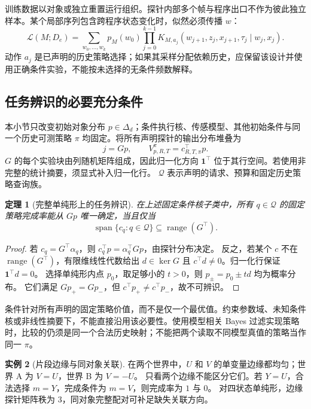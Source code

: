 \documentclass[11pt,a4paper,fontset=fandol]{ctexart}
\newtheorem{theorem}{定理}[section]
\theoremstyle{definition}
\newtheorem{example}[theorem]{实例}
\theoremstyle{remark}
\numberwithin{equation}{section}
\begin{document}
训练数据以对象或独立重置运行组织。探针内部多个帧与程序出口不作为彼此独立样本。某个局部序列包含跨程序状态变化时，似然必须传播 $w$：
\begin{equation}
 \mathcal L(M;D_e)=
 \sum_{w_0,\ldots,w_k}p_M(w_0)
 \prod_{j=0}^{k-1}K_{M,a_j}(w_{j+1},z_j,x_{j+1},\tau_j\mid w_j,x_j).
 \label{eq:sequence-likelihood}
\end{equation}
动作 $a_j$ 是已声明的历史策略选择；如果其采样分配依赖历史，应保留该设计并使用正确条件实验，不能按未选择的无条件频数解释。

\subsection{任务辨识的必要充分条件}
本小节只改变初始对象分布 $p\in\Delta_d$；条件执行核、传感模型、其他初始条件与同一个历史可测策略 $\pi$ 均固定。将所有声明探针的输出分布堆叠为
\begin{equation}
 j=Gp,\qquad V_{p,R,T}^{\pi}=c_{R,T,\pi}^{\top}p .
 \label{eq:linear-probe}
\end{equation}
$G$ 的每个实验块由列随机矩阵组成，因此归一化方向 $\mathbf1^\top$ 位于其行空间。若使用非完整的统计摘要，须显式补入归一化行。
$\mathcal Q$ 表示声明的请求、预算和固定历史策略查询族。

\begin{theorem}[完整单纯形上的任务辨识]
\label{thm:ident}
在上述固定条件核子类中，所有 $q\in\mathcal Q$ 的固定策略完成率能从 $Gp$ 唯一确定，当且仅当
\begin{equation}
 \boxed{\operatorname{span}\{c_q:q\in\mathcal Q\}
 \subseteq\operatorname{range}(G^\top).}
 \label{eq:rowspace}
\end{equation}
\end{theorem}
\begin{proof}
若 $c_q=G^\top\alpha_q$，则 $c_q^\top p=\alpha_q^\top Gp$，由探针分布决定。
反之，若某个 $c$ 不在 $\operatorname{range}(G^\top)$，有限维线性代数给出
$d\in\ker G$ 且 $c^\top d\ne0$。归一化行保证 $\mathbf1^\top d=0$。
选择单纯形内点 $p_0$，取足够小的 $t>0$，则 $p_\pm=p_0\pm td$ 均为概率分布。
它们满足 $Gp_+=Gp_-$，但 $c^\top p_+\ne c^\top p_-$，故不可辨识。
\end{proof}

条件针对所有声明的固定策略价值，而不是仅一个最优值。约束参数域、未知条件核或非线性摘要下，不能直接沿用该必要性。使用模型相关 Bayes 过滤实现策略时，比较的仍须是同一个合法历史映射；不能把两个读取不同模型真值的策略当作同一 $\pi$。

\begin{example}[片段边缘与同对象关联]
在两个世界中，$U$ 和 $V$ 的单变量边缘都均匀；世界 A 为 $V=U$，世界 B 为 $V=-U$。
只看两个边缘不能区分它们。若 $Y=U$，合法选择 $m=Y$，完成条件为 $m=V$，则完成率为 $1$ 与 $0$。
对四状态单纯形，边缘探针矩阵秩为 $3$，同对象完整配对可补足缺失关联方向。
\end{example}
\end{document}
